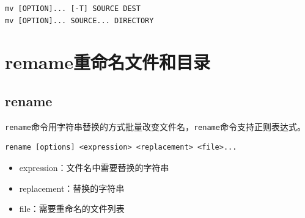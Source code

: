 \documentclass[12pt, openany, oneside]{book}
\begin{document}
\vspace{-0.5cm}
\begin{lstlisting}
mv [OPTION]... [-T] SOURCE DEST
mv [OPTION]... SOURCE... DIRECTORY
\end{lstlisting}

\begin{table}[H]
    \centering
    \caption{\lstinline|mv|参数说明}
\end{table}

\newpage

\section{remame重命名文件和目录}

\subsection{rename}

\lstinline|rename|命令用字符串替换的方式批量改变文件名，\lstinline|rename|命令支持正则表达式。

\vspace{-0.5cm}
\begin{lstlisting}
rename [options] <expression> <replacement> <file>...
\end{lstlisting}

\begin{itemize}
    \item expression：文件名中需要替换的字符串

    \item replacement：替换的字符串

    \item file：需要重命名的文件列表
\end{itemize}
\end{document}
